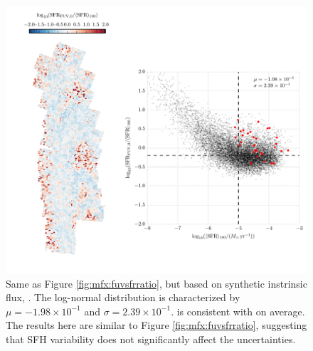 \begin{figure}
\centering
\includegraphics[width=\textwidth]{m31flux-figures/sfr_fuv0-vs-mean.pdf}
\caption[Ratio of the \sfr{} based on the synthetic intrinsic \fuv{} flux to
the $100\myr$ mean \sfr{}.]{Same as Figure \ref{fig:mfx:fuvsfrratio}, but based
    on synthetic instrinsic flux, \sfrfuvz{}. The log-normal distribution is
    characterized by $\mu = -1.98\times 10^{-1}$ and $\sigma = 2.39\times
    10^{-1}$. \sfrfuvz{} is consistent with \sfroneh{} on average. The results
    here are similar to Figure \ref{fig:mfx:fuvsfrratio}, suggesting that SFH
    variability does not significantly affect the \sfrfuv{} uncertainties.
}
\label{fig:mfx:fuvzsfrratio}
\end{figure}


